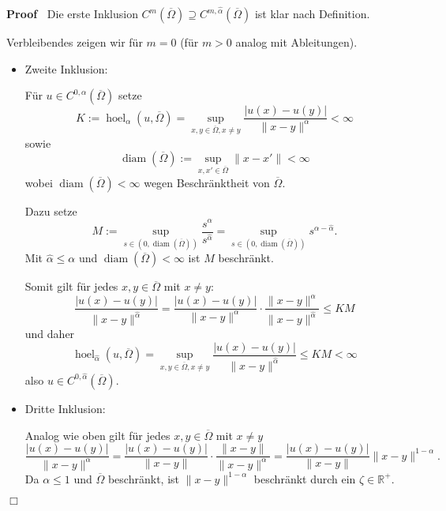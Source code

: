 \documentclass{book}
\newcommand{\assign}{:=}
\newcommand{\tmop}[1]{\ensuremath{\operatorname{#1}}}
\newenvironment{itemizedot}{\begin{itemize} \renewcommand{\labelitemi}{$\bullet$}\renewcommand{\labelitemii}{$\bullet$}\renewcommand{\labelitemiii}{$\bullet$}\renewcommand{\labelitemiv}{$\bullet$}}{\end{itemize}}
\newenvironment{proof}{\noindent\textbf{Proof\ }}{\hspace*{\fill}$\Box$\medskip}
\begin{document}
\begin{proof}
  Die erste Inklusion $C^m \left( \overline{\Omega} \right) \supseteq C^{m,
  \hat{\alpha}} \left( \overline{\Omega} \right)$ ist klar nach Definition.
  
  Verbleibendes zeigen wir f{\"u}r $m = 0$ (f{\"u}r $m > 0$ analog mit
  Ableitungen).
  \begin{itemizedot}
    \item Zweite Inklusion:
    
    F{\"u}r $u \in C^{0, \alpha} \left( \overline{\Omega} \right)$ setze
    \[ K \assign \tmop{hoel}_{\alpha} \left( u, \overline{\Omega} \right) =
       \sup_{x, y \in \overline{\Omega}, x \neq y} \frac{| u (x) - u (y) |}{\|
       x - y \|^{\alpha}} < \infty \]
    sowie
    \[ \tmop{diam} \left( \overline{\Omega} \right) \assign \sup_{x, x' \in
       \overline{\Omega}} \| x - x' \| < \infty \]
    wobei $\tmop{diam} \left( \overline{\Omega} \right) < \infty$ wegen
    Beschr{\"a}nktheit von $\overline{\Omega}$.
    
    Dazu setze
    \[ M \assign \sup_{s \in \left( 0, \tmop{diam} \left( \overline{\Omega}
       \right) \right)} \frac{s^{\alpha}}{s^{\hat{\alpha}}} = \sup_{s \in
       \left( 0, \tmop{diam} \left( \overline{\Omega} \right) \right)}
       s^{\alpha - \hat{\alpha}} . \]
    {\hspace{1.7em}}Mit $\hat{\alpha} \leq \alpha$ und $\tmop{diam} \left(
    \overline{\Omega} \right) < \infty$ ist $M$ beschr{\"a}nkt.
    
    Somit gilt f{\"u}r jedes $x, y \in \overline{\Omega}$ mit $x \neq y$:
    \[ \frac{| u (x) - u (y) |}{\| x - y \|^{\hat{\alpha}}} = \frac{| u (x) -
       u (y) |}{\| x - y \|^{\alpha}} \cdot \frac{\| x - y \|^{\alpha}}{\| x -
       y \|^{\hat{\alpha}}} \leqslant K M \]
    und daher
    \[ \tmop{hoel}_{\hat{\alpha}} \left( u, \overline{\Omega} \right) =
       \sup_{x, y \in \overline{\Omega}, x \neq y} \frac{| u (x) - u (y) |}{\|
       x - y \|^{\hat{\alpha}}} \leqslant K M < \infty \]
    also $u \in C^{0, \hat{\alpha}} \left( \overline{\Omega} \right)$.
    
    \item  Dritte Inklusion:
    
    Analog wie oben gilt f{\"u}r jedes $x, y \in \overline{\Omega}$ mit $x
    \neq y$ \
    \[ \frac{| u (x) - u (y) |}{\| x - y \|^{\alpha}} = \frac{| u (x) - u (y)
       |}{\| x - y \|} \cdot \frac{\| x - y \|}{\| x - y \|^{\alpha}} =
       \frac{| u (x) - u (y) |}{\| x - y \|} \| x - y \|^{1 - \alpha} . \]
    {\hspace{1.7em}}Da $\alpha \leqslant 1$ und $\overline{\Omega}$
    beschr{\"a}nkt, ist $\| x - y \|^{1 - \alpha}$ beschr{\"a}nkt durch ein
    $\zeta \in \mathbb{R^+}$.
    

\end{itemizedot}
\end{proof}
\end{document}
